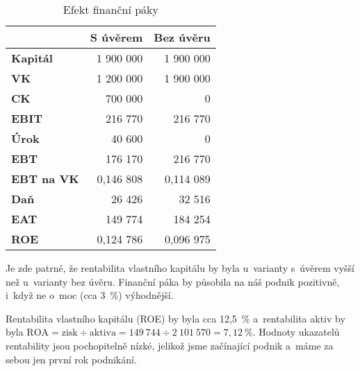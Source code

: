 \begin{table}[htbp]
\begin{center}
\begin{tabular}{ l | r r }
& \multicolumn{1}{|c}{\textbf{S úvěrem}} & \multicolumn{1}{l}{\textbf{Bez úvěru}} \\ \hline
\textbf{Kapitál}              & 1 900 000                             & 1 900 000                              \\
\textbf{VK}                   & 1 200 000                             & 1 900 000                              \\
\textbf{CK}                   & 700 000                               & 0                                      \\
\textbf{EBIT}                 & 216 770                               & 216 770                                \\
\textbf{Úrok}                 & 40 600                                & 0                                      \\
\textbf{EBT}                  & 176 170                               & 216 770                                \\
\textbf{EBT na VK}            & 0,146 808                              & 0,114 089                               \\
\textbf{Daň}                  & 26 426                                & 32 516                                 \\
\textbf{EAT}                  & 149 774                               & 184 254                                \\
\textbf{ROE}                  & 0,124 786                              & 0,096 975                              
\end{tabular}
\caption{Efekt finanční páky}
\label{efekt_financni_paky}
\end{center}
\end{table}

Je zde patrné, že rentabilita vlastního kapitálu by byla u~varianty s~úvěrem vyšší než u~varianty bez úvěru. Finanční páka by působila na náš podnik pozitivně, i~když ne o~moc (cca 3~\%) výhodnější.

Rentabilita vlastního kapitálu (ROE) by byla cca 12,5~\% a~rentabilita aktiv by byla $ \text{ROA} = \text{zisk} \div \text{aktiva} = 149~744 \div 2~101~570 = 7,12~\%$. Hodnoty ukazatelů rentability jsou pochopitelně nízké, jelikož jsme začínající podnik a~máme za sebou jen první  rok podnikání.





